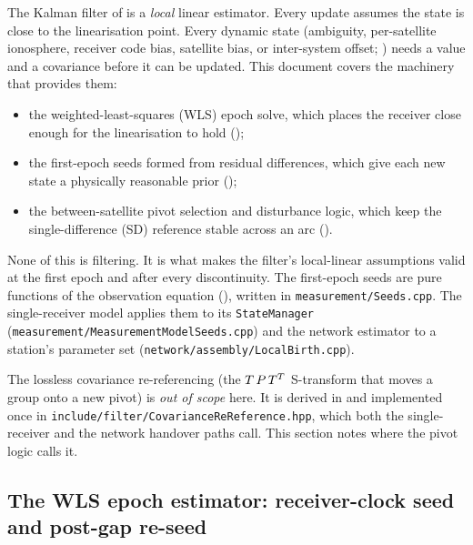\documentclass[main.tex]{subfiles}
\begin{document}
The Kalman filter of  is a
\emph{local} linear estimator.  Every update assumes the state is close
to the linearisation point.  Every dynamic state (ambiguity,
per-satellite ionosphere, receiver code bias, satellite bias, or
inter-system offset; ) needs a
value and a covariance before it can be updated.  This document covers
the machinery that provides them:
\begin{itemize}[leftmargin=*]
\item the weighted-least-squares (WLS) epoch solve, which places the
      receiver close enough for the linearisation to hold
      ();
\item the first-epoch seeds formed from residual differences, which give
      each new state a physically reasonable prior
      ();
\item the between-satellite pivot selection and disturbance logic, which
      keep the single-difference (SD) reference stable across an arc
      ().
\end{itemize}
None of this is filtering.  It is what makes the filter's local-linear
assumptions valid at the first epoch and after every discontinuity.
The first-epoch seeds are pure functions of the observation equation
(), written in \texttt{measurement/Seeds.cpp}.  The single-receiver model
applies them to its \texttt{StateManager}
(\texttt{measurement/MeasurementModelSeeds.cpp}) and the network estimator to a
station's parameter set (\texttt{network/assembly/LocalBirth.cpp}).

The lossless covariance re-referencing (the
$T\,P\,T^{T}$ S\nobreakdash-transform that moves
a group onto a new pivot) is \emph{out of scope} here.  It is derived in
 and implemented once in
\texttt{include/filter/CovarianceReReference.hpp}, which both the
single-receiver and the network handover paths call.  This section notes
where the pivot logic calls it.

\subsection{The WLS epoch estimator: receiver-clock seed and post-gap re-seed}
\label{sec:estinfra-wls}
\end{document}
